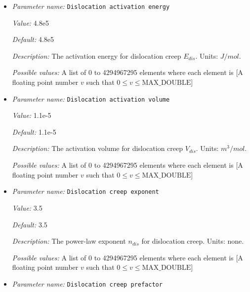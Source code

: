 \begin{itemize}
{\it Description:} The prefactor for the diffusion creep law $A_{diff}$. Units: $m^{p_{diff}} Pa^{-n_{diff}}/s$.


{\it Possible values:} A list of 0 to 4294967295 elements where each element is [A floating point number $v$ such that $0 \leq v \leq \text{MAX\_DOUBLE}$]
\item {\it Parameter name:} {\tt Dislocation activation energy}
\label{parameters:Material model/Grain size model/Dislocation activation energy}


{\it Value:} 4.8e5


{\it Default:} 4.8e5


{\it Description:} The activation energy for dislocation creep $E_{dis}$. Units: $J/mol$.


{\it Possible values:} A list of 0 to 4294967295 elements where each element is [A floating point number $v$ such that $0 \leq v \leq \text{MAX\_DOUBLE}$]
\item {\it Parameter name:} {\tt Dislocation activation volume}
\label{parameters:Material model/Grain size model/Dislocation activation volume}


{\it Value:} 1.1e-5


{\it Default:} 1.1e-5


{\it Description:} The activation volume for dislocation creep $V_{dis}$. Units: $m^3/mol$.


{\it Possible values:} A list of 0 to 4294967295 elements where each element is [A floating point number $v$ such that $0 \leq v \leq \text{MAX\_DOUBLE}$]
\item {\it Parameter name:} {\tt Dislocation creep exponent}
\label{parameters:Material model/Grain size model/Dislocation creep exponent}


{\it Value:} 3.5


{\it Default:} 3.5


{\it Description:} The power-law exponent $n_{dis}$ for dislocation creep. Units: none.


{\it Possible values:} A list of 0 to 4294967295 elements where each element is [A floating point number $v$ such that $0 \leq v \leq \text{MAX\_DOUBLE}$]
\item {\it Parameter name:} {\tt Dislocation creep prefactor}
\label{parameters:Material model/Grain size model/Dislocation creep prefactor}



\end{itemize}
